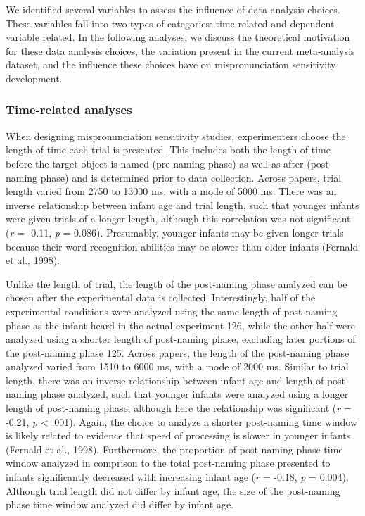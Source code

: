\documentclass[man]{apa6}
\theoremstyle{definition}
\theoremstyle{definition}
\theoremstyle{definition}
\theoremstyle{remark}
\begin{document}
We identified several variables to assess the influence of data analysis
choices. These variables fall into two types of categories: time-related
and dependent variable related. In the following analyses, we discuss
the theoretical motivation for these data analysis choices, the
variation present in the current meta-analysis dataset, and the
influence these choices have on mispronunciation sensitivity
development.

\subsubsection{Time-related analyses}\label{time-related-analyses}

When designing mispronunciation sensitivity studies, experimenters
choose the length of time each trial is presented. This includes both
the length of time before the target object is named (pre-naming phase)
as well as after (post-naming phase) and is determined prior to data
collection. Across papers, trial length varied from 2750 to 13000 ms,
with a mode of 5000 ms. There was an inverse relationship between infant
age and trial length, such that younger infants were given trials of a
longer length, although this correlation was not significant (\emph{r} =
-0.11, \emph{p} = 0.086). Presumably, younger infants may be given
longer trials because their word recognition abilities may be slower
than older infants (Fernald et al., 1998).

Unlike the length of trial, the length of the post-naming phase analyzed
can be chosen after the experimental data is collected. Interestingly,
half of the experimental conditions were analyzed using the same length
of post-naming phase as the infant heard in the actual experiment 126,
while the other half were analyzed using a shorter length of post-naming
phase, excluding later portions of the post-naming phase 125. Across
papers, the length of the post-naming phase analyzed varied from 1510 to
6000 ms, with a mode of 2000 ms. Similar to trial length, there was an
inverse relationship between infant age and length of post-naming phase
analyzed, such that younger infants were analyzed using a longer length
of post-naming phase, although here the relationship was significant
(\emph{r} = -0.21, \emph{p} \textless{} .001). Again, the choice to
analyze a shorter post-naming time window is likely related to evidence
that speed of processing is slower in younger infants (Fernald et al.,
1998). Furthermore, the proportion of post-naming phase time window
analyzed in comprison to the total post-naming phase presented to
infants significantly decreased with increasing infant age (\emph{r} =
-0.18, \emph{p} = 0.004). Although trial length did not differ by infant
age, the size of the post-naming phase time window analyzed did differ
by infant age.
\end{document}
